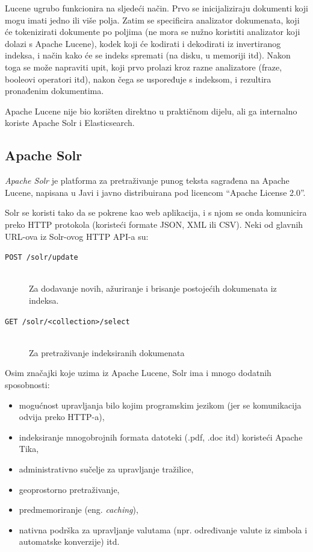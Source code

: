 \documentclass[a4paper,twoside,12pt]{scrreprt}
\begin{document}
Lucene ugrubo funkcionira na sljedeći način. Prvo se inicijaliziraju dokumenti koji mogu imati jedno ili više polja. Zatim se specificira analizator dokumenata, koji će tokenizirati dokumente po poljima (ne mora se nužno koristiti analizator koji dolazi s Apache Lucene), kodek koji će kodirati i dekodirati iz invertiranog indeksa, i način kako će se indeks spremati (na disku, u memoriji itd). Nakon toga se može napraviti upit, koji prvo prolazi kroz razne analizatore (fraze, booleovi operatori itd), nakon čega se uspoređuje s indeksom, i rezultira pronađenim dokumentima.

Apache Lucene nije bio korišten direktno u praktičnom dijelu, ali ga internalno koriste Apache Solr i Elasticsearch.

\subsection{Apache Solr}

\textit{Apache Solr} je platforma za pretraživanje punog teksta sagrađena na Apache Lucene, napisana u Javi i javno distribuirana pod licencom ``Apache License 2.0''.

Solr se koristi tako da se pokrene kao web aplikacija, i s njom se onda komunicira preko HTTP protokola (koristeći formate JSON, XML ili CSV). Neki od glavnih URL-ova iz Solr-ovog HTTP API-a su:

\begin{description}
  \item[\texttt{POST /solr/update}] \hfill \\ Za dodavanje novih, ažuriranje i brisanje postojećih dokumenata iz indeksa.
  \item[\texttt{GET /solr/<collection>/select}] \hfill \\ Za pretraživanje indeksiranih dokumenata
\end{description}

Osim značajki koje uzima iz Apache Lucene, Solr ima i mnogo dodatnih sposobnosti:

\begin{itemize}
  \item mogućnost upravljanja bilo kojim programskim jezikom (jer se komunikacija odvija preko HTTP-a),
  \item indeksiranje mnogobrojnih formata datoteki (.pdf, .doc itd) koristeći Apache Tika,
  \item administrativno sučelje za upravljanje tražilice,
  \item geoprostorno pretraživanje,
  \item predmemoriranje (eng. \textit{caching}),
  \item nativna podrška za upravljanje valutama (npr. određivanje valute iz simbola i automatske konverzije) itd.
\end{itemize}
\end{document}
